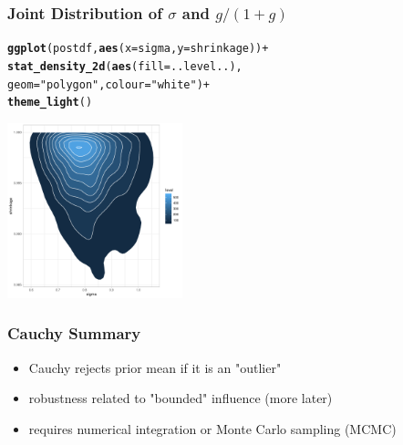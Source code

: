 \documentclass[handout]{beamer}\usepackage[]{graphicx}\usepackage[]{color}
\makeatletter
\newcommand{\hlstr}[1]{\textcolor[rgb]{0.192,0.494,0.8}{#1}}%
\newcommand{\hlopt}[1]{\textcolor[rgb]{0,0,0}{#1}}%
\newcommand{\hlstd}[1]{\textcolor[rgb]{0.345,0.345,0.345}{#1}}%
\newcommand{\hlkwc}[1]{\textcolor[rgb]{0.333,0.667,0.333}{#1}}%
\newcommand{\hlkwd}[1]{\textcolor[rgb]{0.737,0.353,0.396}{\textbf{#1}}}%
\newenvironment{kframe}{%
 \def\at@end@of@kframe{}%
 \ifinner\ifhmode%
  \def\at@end@of@kframe{\end{minipage}}%
  \begin{minipage}{\columnwidth}%
 \fi\fi%
 \def\FrameCommand##1{\hskip\@totalleftmargin \hskip-\fboxsep
 \colorbox{shadecolor}{##1}\hskip-\fboxsep
     \hskip-\linewidth \hskip-\@totalleftmargin \hskip\columnwidth}%
 \MakeFramed {\advance\hsize-\width
   \@totalleftmargin\z@ \linewidth\hsize
   \@setminipage}}%
 {\par\unskip\endMakeFramed%
 \at@end@of@kframe}
\newenvironment{knitrout}{}{} %
\makeatother
\begin{document}
\begin{frame}[fragile] \frametitle{Joint Distribution of $\sigma$ and $g/(1 + g)$}

\begin{knitrout}
\color{fgcolor}\begin{kframe}
\begin{alltt}
\hlkwd{ggplot}\hlstd{(postdf,} \hlkwd{aes}\hlstd{(}\hlkwc{x}\hlstd{=sigma,} \hlkwc{y}\hlstd{=shrinkage) )} \hlopt{+}
 \hlkwd{stat_density_2d}\hlstd{(}\hlkwd{aes}\hlstd{(}\hlkwc{fill} \hlstd{= ..level..),}
                 \hlkwc{geom} \hlstd{=} \hlstr{"polygon"}\hlstd{,} \hlkwc{colour}\hlstd{=}\hlstr{"white"}\hlstd{)} \hlopt{+}
  \hlkwd{theme_light}\hlstd{()}
\end{alltt}
\end{kframe}
\includegraphics[width=2in,height=2in]{figure/unnamed-chunk-6-1} 

\end{knitrout}


\end{frame}

\begin{frame}\frametitle{Cauchy Summary}
\begin{itemize}
\item Cauchy rejects prior mean if it is an "outlier"
\item robustness related to "bounded" influence (more later)
\item requires numerical integration or Monte Carlo sampling (MCMC)
\end{itemize}
\end{frame}
\end{document}
